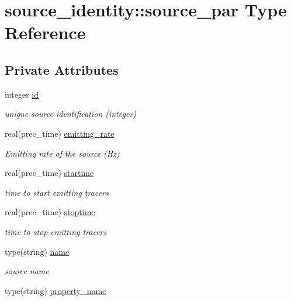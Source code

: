 \hypertarget{structsource__identity_1_1source__par}{}\section{source\+\_\+identity\+:\+:source\+\_\+par Type Reference}
\label{structsource__identity_1_1source__par}
\subsection*{Private Attributes}
\begin{DoxyCompactItemize}
\item 
integer \mbox{\hyperlink{structsource__identity_1_1source__par_a05b6d325908a1b552f98dada275a3465}{id}}
\begin{DoxyCompactList}\small\item\em unique source identification (integer) \end{DoxyCompactList}\item 
real(prec\+\_\+time) \mbox{\hyperlink{structsource__identity_1_1source__par_a746a02960ffcba9f699ae45fa55dd8b4}{emitting\+\_\+rate}}
\begin{DoxyCompactList}\small\item\em Emitting rate of the source (Hz) \end{DoxyCompactList}\item 
real(prec\+\_\+time) \mbox{\hyperlink{structsource__identity_1_1source__par_a11cd864db9e9021cec4bd018d6fec295}{startime}}
\begin{DoxyCompactList}\small\item\em time to start emitting tracers \end{DoxyCompactList}\item 
real(prec\+\_\+time) \mbox{\hyperlink{structsource__identity_1_1source__par_a3ab5e22242b41bdcd56480b9d0496efa}{stoptime}}
\begin{DoxyCompactList}\small\item\em time to stop emitting tracers \end{DoxyCompactList}\item 
type(string) \mbox{\hyperlink{structsource__identity_1_1source__par_a71ef7dc8c6268d014247e0bca3005311}{name}}
\begin{DoxyCompactList}\small\item\em source name \end{DoxyCompactList}\item 
type(string) \mbox{\hyperlink{structsource__identity_1_1source__par_a0205c62b7673e76c7f1de2bfcecabd84}{property\+\_\+name}}

\end{DoxyCompactItemize}
